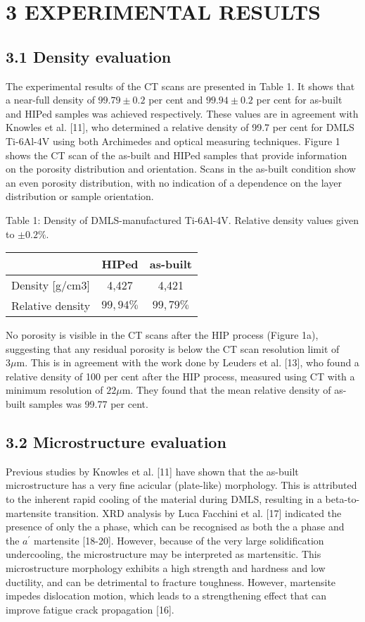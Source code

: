 \documentclass[10pt]{article}
\begin{document}
\section*{3 EXPERIMENTAL RESULTS}
\subsection*{3.1 Density evaluation}
The experimental results of the CT scans are presented in Table 1. It shows that a near-full density of $99.79 \pm 0.2$ per cent and $99.94 \pm 0.2$ per cent for as-built and HIPed samples was achieved respectively. These values are in agreement with Knowles et al. [11], who determined a relative density of 99.7 per cent for DMLS Ti-6Al-4V using both Archimedes and optical measuring techniques. Figure 1 shows the CT scan of the as-built and HIPed samples that provide information on the porosity distribution and orientation. Scans in the as-built condition show an even porosity distribution, with no indication of a dependence on the layer distribution or sample orientation.

Table 1: Density of DMLS-manufactured Ti-6Al-4V. Relative density values given to $\pm 0.2 \%$.

\begin{center}
\begin{tabular}{|l|c|c|}
\hline
 & HIPed & as-built \\
\hline
Density [g/cm3] & 4,427 & 4,421 \\
\hline
Relative density & $99,94 \%$ & $99,79 \%$ \\
\hline
\end{tabular}
\end{center}

No porosity is visible in the CT scans after the HIP process (Figure 1a), suggesting that any residual porosity is below the CT scan resolution limit of $3 \mu \mathrm{m}$. This is in agreement with the work done by Leuders et al. [13], who found a relative density of 100 per cent after the HIP process, measured using CT with a minimum resolution of $22 \mu \mathrm{m}$. They found that the mean relative density of as-built samples was 99.77 per cent.

\subsection*{3.2 Microstructure evaluation}
Previous studies by Knowles et al. [11] have shown that the as-built microstructure has a very fine acicular (plate-like) morphology. This is attributed to the inherent rapid cooling of the material during DMLS, resulting in a beta-to-martensite transition. XRD analysis by Luca Facchini et al. [17] indicated the presence of only the a phase, which can be recognised as both the a phase and the $a^{\prime}$ martensite [18-20]. However, because of the very large solidification undercooling, the microstructure may be interpreted as martensitic. This microstructure morphology exhibits a high strength and hardness and low ductility, and can be detrimental to fracture toughness. However, martensite impedes dislocation motion, which leads to a strengthening effect that can improve fatigue crack propagation [16].
\end{document}
